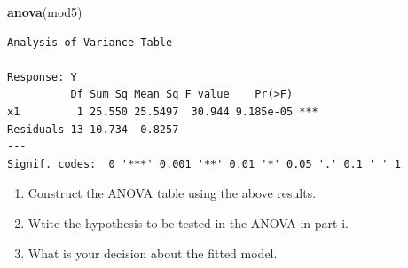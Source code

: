 \documentclass[]{article}
\newenvironment{Shaded}{\begin{snugshade}}{\end{snugshade}}
\newcommand{\KeywordTok}[1]{\textcolor[rgb]{0.13,0.29,0.53}{\textbf{#1}}}
\newcommand{\NormalTok}[1]{#1}
\begin{document}
\begin{Shaded}
\begin{Highlighting}[]
\KeywordTok{anova}\NormalTok{(mod5)}
\end{Highlighting}
\end{Shaded}

\begin{verbatim}
Analysis of Variance Table

Response: Y
          Df Sum Sq Mean Sq F value    Pr(>F)    
x1         1 25.550 25.5497  30.944 9.185e-05 ***
Residuals 13 10.734  0.8257                      
---
Signif. codes:  0 '***' 0.001 '**' 0.01 '*' 0.05 '.' 0.1 ' ' 1
\end{verbatim}

\begin{enumerate}
\def\labelenumi{\roman{enumi})}
\item
  Construct the ANOVA table using the above results.
\item
  Wtite the hypothesis to be tested in the ANOVA in part i.
\item
  What is your decision about the fitted model.
\end{enumerate}
\end{document}
